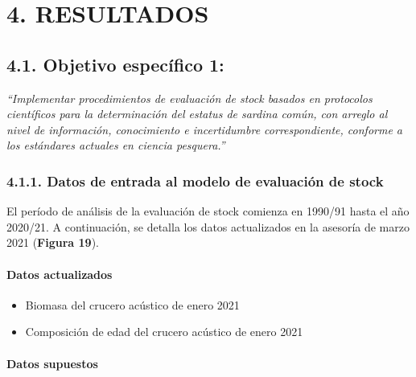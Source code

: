 \documentclass[
  spanish,
]{article}
\providecommand{\tightlist}{%
  \setlength{\itemsep}{0pt}\setlength{\parskip}{0pt}}
\begin{document}
\pagebreak

\hypertarget{resultados}{%
\section{4. RESULTADOS}\label{resultados}}

\hypertarget{objetivo-especuxedfico-1-1}{%
\subsection{4.1. Objetivo específico
1:}\label{objetivo-especuxedfico-1-1}}

\vspace{-0.2cm}

\emph{``Implementar procedimientos de evaluación de stock basados en
protocolos científicos para la determinación del estatus de sardina
común, con arreglo al nivel de información, conocimiento e incertidumbre
correspondiente, conforme a los estándares actuales en ciencia
pesquera.''}

\hypertarget{datos-de-entrada-al-modelo-de-evaluaciuxf3n-de-stock-1}{%
\subsubsection{4.1.1. Datos de entrada al modelo de evaluación de
stock}\label{datos-de-entrada-al-modelo-de-evaluaciuxf3n-de-stock-1}}

El período de análisis de la evaluación de stock comienza en 1990/91
hasta el año 2020/21. A continuación, se detalla los datos actualizados
en la asesoría de marzo 2021 (\textbf{Figura 19}). \vspace{-0.2cm}

\hypertarget{datos-actualizados}{%
\paragraph{Datos actualizados}\label{datos-actualizados}}

\begin{itemize}
\tightlist
\item
  Biomasa del crucero acústico de enero 2021
\item
  Composición de edad del crucero acústico de enero 2021
\end{itemize}

\hypertarget{datos-supuestos}{%
\paragraph{Datos supuestos}\label{datos-supuestos}}
\end{document}
